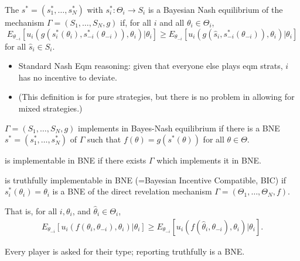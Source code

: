 \documentclass[english,handout,10pt]{beamer}		%
\def\lyxframeend{} %
\begin{document}
\begin{definition}
	The  $s^* =(s_{1}^*,\dots,s_{N}^*)$ with $s_i^*: \Theta_i \to S_i$ is a \alert{Bayesian Nash equilibrium} of the mechanism $\Gamma=(S_{1},\dots,S_{N},g)$ if, for all $i$ and all $\theta_{i}\in\Theta_{i}$,
	$$E_{\theta_{-i}}\left[u_{i}(g(s_i^*(\theta_i),s_{-i}^*(\theta_{-i})),\theta_{i})|\theta_{i}\right]\geq E_{\theta_{-i}}\left[u_{i}(g(\hat s_i,s_{-i}^*(\theta_{-i})),\theta_{i})|\theta_{i}\right]$$
	for all $\hat s_{i}\in S_{i}$.
\end{definition}
\pause
\begin{itemize}
	\item Standard Nash Eqm reasoning: given that everyone else plays eqm strats, $i$ has no incentive to deviate.
	\item (This definition is for pure strategies, but there is no problem in allowing for mixed strategies.)
\end{itemize}
\lyxframeend


\begin{definition}
	 $\Gamma=(S_{1},\dots,S_{N},g)$ \alert{implements  in Bayes-Nash equilibrium} if there is a BNE $s^*=(s_{1}^*,\dots,s_{N}^*)$ of $\Gamma$ such that $f(\theta)=g(s^{*}(\theta))$ for all $\theta\in \Theta$.
\end{definition}
\pause
\begin{definition}
	 is \alert{implementable in BNE} if there exists $\Gamma$ which implements it in BNE.
\end{definition}
\lyxframeend


\begin{definition}
	 is \alert{truthfully implementable in BNE} (=Bayesian Incentive Compatible, \alert{BIC}) if $s_{i}^*(\theta_{i})=\theta_{i}$ is a BNE of the direct revelation mechanism $\Gamma=(\Theta_{1},\dots,\Theta_{N},f)$. 
	\bigskip
	
	That is, for all $i,\theta_{i}$, and $\hat{\theta}_{i}\in\Theta_{i}$,
	\vspace{-0.5em}\begin{align*}
		E_{\theta_{-i}}\left[u_{i}(f(\theta_i,\theta_{-i}),\theta_{i})|\theta_{i}\right]\geq E_{\theta_{-i}}\left[u_{i}(f(\hat \theta_{i},\theta_{-i}),\theta_{i})|\theta_{i}\right].
	\end{align*}\vspace{-1em}
\end{definition}
\pause
Every player is asked for their type; reporting truthfully is a BNE.
\lyxframeend
\end{document}
